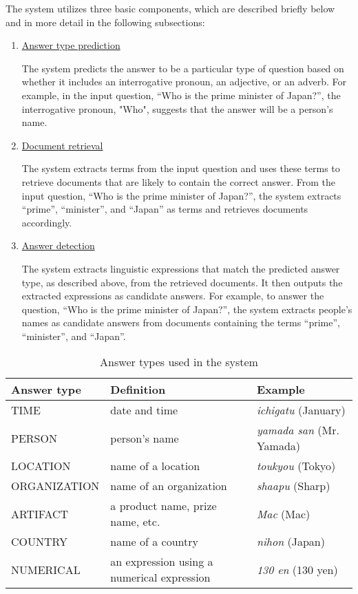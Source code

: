 The system utilizes three basic components, which are described briefly below and 
in more detail in the following subsections:
\begin{enumerate}
\item \label{enum:expect_answer_type}
\underline{Answer type prediction} 

The system predicts the answer to be a particular type of question based on 
whether it includes an interrogative pronoun, 
an adjective, or an adverb. 
For example, in the input question, ``Who is the prime minister of Japan?'', 
the interrogative pronoun, "Who", suggests that the answer will be a person's name. 

\item \label{enum:document_retrieval}
\underline{Document retrieval} 

The system extracts terms from the input question and uses these terms to retrieve documents
that are likely to contain the 
correct answer.  
From the input question, ``Who is the prime minister of Japan?'', the system extracts 
``prime'', ``minister'', and ``Japan'' as terms and retrieves documents accordingly. 

\item 
\underline{Answer detection} 

The system extracts linguistic expressions that match the predicted answer type, 
as described above, from the retrieved documents. 
It then outputs the extracted expressions as candidate answers.  
For example, 
to answer the question, ``Who is the prime minister of Japan?'', the system extracts 
people's names as candidate answers 
from documents containing the terms ``prime'', ``minister'', and ``Japan''. 

\end{enumerate}

\begin{table}[t]
  \begin{center}
    \caption{Answer types used in the system}
    \begin{tabular}{|l|l|l|} \hline
Answer type  & Definition & Example \\\hline
TIME         & date and time   & {\it ichigatu} (January) \\
PERSON       & person's name       & {\it yamada san} (Mr. Yamada)\\ 
LOCATION     & name of a location  & {\it toukyou} (Tokyo)\\
ORGANIZATION & name of an organization & {\it shaapu} (Sharp)\\
ARTIFACT     & a product name, prize name, etc. & {\it Mac} (Mac)\\
COUNTRY      & name of a country      & {\it nihon} (Japan)\\
NUMERICAL    & an expression using a numerical expression & {\it 130 en} (130 yen)\\\hline
\end{tabular}
\label{tab:answer_types}
\end{center}
\end{table}

